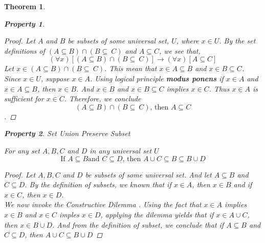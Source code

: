 \documentclass{book}
\newtheorem{theorem}{Theorem}[section]
\newtheorem{property}{Property}[theorem]
\theoremstyle{definition}
\theoremstyle{remark}
\begin{document}
\begin{theorem}
\begin{property}
        \begin{proof}
            Let $A$ and $B$ be subsets of some universal set, $U$, where $x \in U$. By the set definitions of $(A \subseteq B) \cap (B \subseteq\ C)$ and $A \subseteq C$, we see that, 
                \begin{equation*}
                    (\forall x)[(A \subseteq B) \cap (B \subseteq\ C)] \to (\forall x)[A \subseteq C]
                \end{equation*}
            Let $x \in (A \subseteq B) \cap (B \subseteq\ C)$. This mean that $x \in A \subseteq B$ and $x \in B \subseteq C$. Since $x \in U$, suppose $x \in A$. Using logical principle \textbf{modus ponens} \footnotemark if $x \in A$ and $x \in A \subseteq B$, then $x \in B$. And $x \in B$ and $x \in B \subseteq C$ implies $x \in C$. Thus $x \in A$ is sufficient for $x \in C$. Therefore, we conclude $$ (A \subseteq B) \cap (B \subseteq\ C)\text{, then } A \subseteq C $$.
        \end{proof}
    \end{property}
    
    
    
    
    
    \newpage
    \begin{property}
    Set Union Preserve Subset \\
        \begin{tcolorbox}
            For any set $A, B, C$ and $D$ in any universal set $U$
                \begin{equation*}
                    \text{If } A \subseteq B \text{and } C \subseteq D \text{, then } A \cup C \subseteq B \subseteq B \cup D
                \end{equation*}
        \end{tcolorbox}
    
        \begin{proof}
            Let  $A, B, C$ and $D$ be subsets of some universal set. And let $A \subseteq B$ and $C \subseteq D$. By the definition of subsets, we known that if $x \in A$, then $x \in B$ and if $x \in C$, then $x \in D$. \\
            We now invoke the \textit{Constructive Dilemma} \footnotemark. Using the fact that $x \in A$ implies $x \in B$ and $x \in C$ imples $x \in D$, applying the dilemma yields that if $x \in A \cup C$, then $x \in B \cup D$. And from the definition of subset, we conclude that if $A \subseteq B$ and $C \subseteq D$, then $A \cup C \subseteq B \cup D$
        

\end{proof}
\end{property}
\end{theorem}
\end{document}
